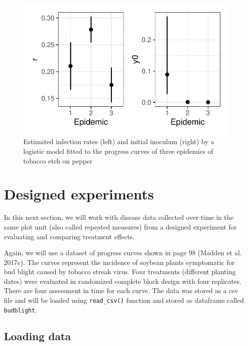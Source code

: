 \documentclass[
  letterpaper,
  DIV=11,
  numbers=noendperiod]{scrreprt}
\begin{document}
\begin{figure}[H]

{\centering \includegraphics{temporal-fitting_files/figure-pdf/fig-params-1.pdf}

}

\caption{\label{fig-params}Estimated infection rates (left) and initial
inoculum (right) by a logistic model fitted to the progress curves of
three epidemics of tobacco etch on pepper}

\end{figure}

\hypertarget{designed-experiments}{%
\section{Designed experiments}\label{designed-experiments}}

In this next section, we will work with disease data collected over time
in the same plot unit (also called repeated measures) from a designed
experiment for evaluating and comparing treatment effects.

Again, we will use a dataset of progress curves shown in page 98 (Madden
et al. 2017c). The curves represent the incidence of soybean plants
symptomatic for bud blight caused by tobacco streak virus. Four
treatments (different planting dates) were evaluated in randomized
complete block design with four replicates. There are four assessment in
time for each curve. The data was stored as a csv file and will be
loaded using \texttt{read\_csv()} function and stored as dataframe
called \texttt{budblight}.

\hypertarget{loading-data}{%
\subsection{Loading data}\label{loading-data}}
\end{document}
